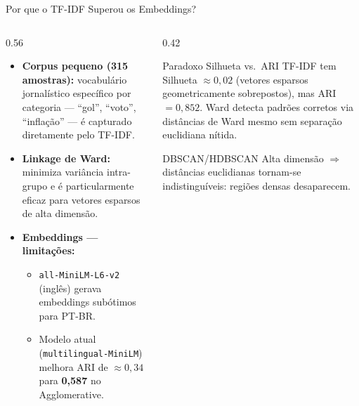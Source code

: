 \documentclass[aspectratio=169]{beamer}
\begin{document}
\begin{frame}{Por que o TF-IDF Superou os Embeddings?}
  \begin{columns}[T]
    \begin{column}{0.56\textwidth}
      \begin{itemize}
        \item \textbf{Corpus pequeno (315 amostras):} vocabulário jornalístico
              específico por categoria — ``gol'', ``voto'', ``inflação'' — é
              capturado diretamente pelo TF-IDF.
        \item \textbf{Linkage de Ward:} minimiza variância intra-grupo e é
              particularmente eficaz para vetores esparsos de alta dimensão.
        \item \textbf{Embeddings — limitações:}
        \begin{itemize}
          \item \texttt{all-MiniLM-L6-v2} (inglês) gerava embeddings subótimos
                para PT-BR.
          \item Modelo atual (\texttt{multilingual-MiniLM}) melhora ARI
                de $\approx 0{,}34$ para \textbf{0{,}587} no Agglomerative.
        \end{itemize}
      \end{itemize}
    \end{column}
    \begin{column}{0.42\textwidth}
      \begin{alertblock}{Paradoxo Silhueta vs.\ ARI}
        \small TF-IDF tem Silhueta $\approx 0{,}02$ (vetores esparsos
        geometricamente sobrepostos), mas ARI $= 0{,}852$.
        Ward detecta padrões corretos via distâncias de Ward
        mesmo sem separação euclidiana nítida.
      \end{alertblock}
      \vspace{0.4em}
      \begin{block}{\small DBSCAN/HDBSCAN}
        \small Alta dimensão $\Rightarrow$ distâncias euclidianas tornam-se
        indistinguíveis: regiões densas desaparecem.
      \end{block}
    \end{column}
  \end{columns}
\end{frame}
\end{document}
